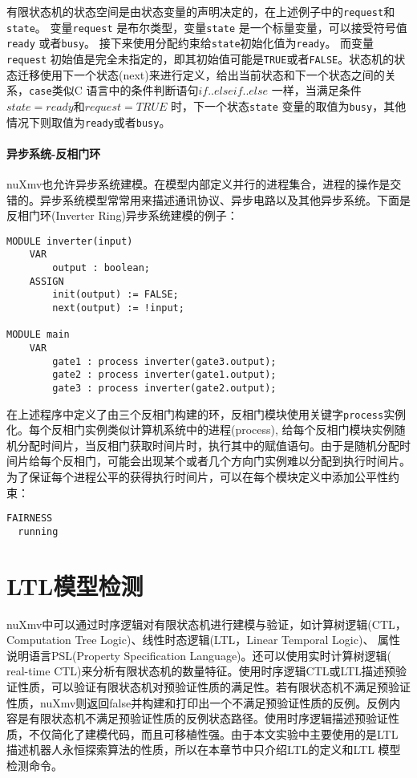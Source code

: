 有限状态机的状态空间是由状态变量的声明决定的，在上述例子中的\verb|request|和\verb|state|。 变量\verb|request| 是布尔类型，变量\verb|state| 是一个标量变量，可以接受符号值\verb|ready| 或者\verb|busy|。 接下来使用分配约束给\verb|state|初始化值为\verb|ready|。 而变量\verb|request| 初始值是完全未指定的，即其初始值可能是\verb|TRUE|或者\verb|FALSE|。状态机的状态迁移使用下一个状态(next)来进行定义，给出当前状态和下一个状态之间的关系，\verb|case|类似C 语言中的条件判断语句$if..else if..else $ 一样，当满足条件$state = ready$和$request = TRUE$ 时，下一个状态\verb|state| 变量的取值为\verb|busy|，其他情况下则取值为\verb|ready|或者\verb|busy|。

\paragraph{异步系统-反相门环}
nuXmv也允许异步系统建模。在模型内部定义并行的进程集合，进程的操作是交错的。异步系统模型常常用来描述通讯协议、异步电路以及其他异步系统。下面是反相门环(Inverter Ring)异步系统建模的例子：

\begin{lstlisting}
MODULE inverter(input)
    VAR
        output : boolean;
    ASSIGN
        init(output) := FALSE;
        next(output) := !input;

MODULE main
    VAR
        gate1 : process inverter(gate3.output);
        gate2 : process inverter(gate1.output);
        gate3 : process inverter(gate2.output);
\end{lstlisting}

在上述程序中定义了由三个反相门构建的环，反相门模块使用关键字\verb|process|实例化。每个反相门实例类似计算机系统中的进程(process), 给每个反相门模块实例随机分配时间片，当反相门获取时间片时，执行其中的赋值语句。由于是随机分配时间片给每个反相门，可能会出现某个或者几个方向门实例难以分配到执行时间片。为了保证每个进程公平的获得执行时间片，可以在每个模块定义中添加公平性约束：

\begin{lstlisting}
FAIRNESS
  running
\end{lstlisting}

\section{LTL模型检测}
nuXmv中可以通过时序逻辑对有限状态机进行建模与验证，如计算树逻辑(CTL，Computation Tree Logic)、线性时态逻辑(LTL，Linear Temporal Logic)、 属性说明语言PSL(Property Specification Language)。还可以使用实时计算树逻辑( real-time CTL)来分析有限状态机的数量特征。使用时序逻辑CTL或LTL描述预验证性质，可以验证有限状态机对预验证性质的满足性。若有限状态机不满足预验证性质，nuXmv则返回false并构建和打印出一个不满足预验证性质的反例。反例内容是有限状态机不满足预验证性质的反例状态路径。使用时序逻辑描述预验证性质，不仅简化了建模代码，而且可移植性强。由于本文实验中主要使用的是LTL 描述机器人永恒探索算法的性质，所以在本章节中只介绍LTL的定义和LTL 模型检测命令。

